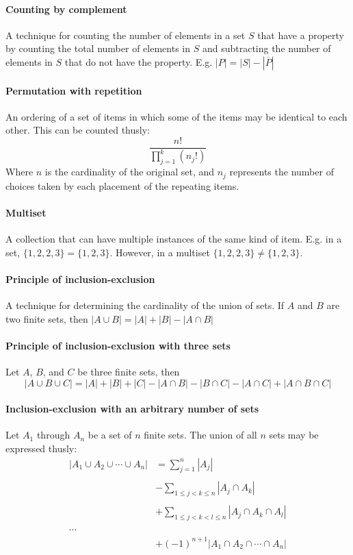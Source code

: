 \documentclass[a4paper]{article}
\begin{document}
\paragraph{Counting by complement} A technique for counting the number of elements in a set $S$ that have a property by counting the total number of elements in $S$ and subtracting the number of elements in $S$ that do not have the property. E.g. $|P| = |S| - |\overline{P}|$
\paragraph{Permutation with repetition} An ordering of a set of items in which some of the items may be identical to each other. This can be counted thusly:
\begin{equation*}
  \frac{n!}{
  \prod_{j=1}^{k} (n_j!)}
\end{equation*}
Where $n$ is the cardinality of the original set, and $n_j$ represents the number of choices taken by each placement of the repeating items.
\paragraph{Multiset} A collection that can have multiple instances of the same kind of item. E.g. in a set, $\{1, 2, 2, 3\} = \{1, 2, 3\}$. However, in a multiset $\{1, 2, 2, 3\} \neq \{1, 2, 3\}$. 
\paragraph{Principle of inclusion-exclusion} A technique for determining the cardinality of the union of sets. If $A$ and $B$ are two finite sets, then $|A \cup B| = |A| + |B| - |A \cap B|$
\paragraph{Principle of inclusion-exclusion with three sets} Let $A$, $B$, and $C$ be three finite sets, then
\begin{equation*}
  |A \cup B \cup C| = |A| + |B| + |C| - |A \cap B| - |B \cap C| - |A \cap C| + |A \cap B \cap C|
\end{equation*}
\paragraph{Inclusion-exclusion with an arbitrary number of sets} Let $A_1$ through $A_n$ be a set of $n$ finite sets. The union of all $n$ sets may be expressed thusly:
\begin{align*}
|A_1 \cup A_2 \cup \cdots \cup A_n|  &= \sum_{j=1}^n |A_j|\\
&\\
& - \sum_{1 \leq j < k \leq n} |A_j \cap A_k|\\
&\\
& + \sum_{1 \leq j < k <  l \leq n} |A_j \cap A_k \cap A_l|\\
&\\
\cdots
&\\
& + (-1)^{n+1} |A_1 \cap A_2 \cap \cdots \cap A_n|
\end{align*}
\end{document}
